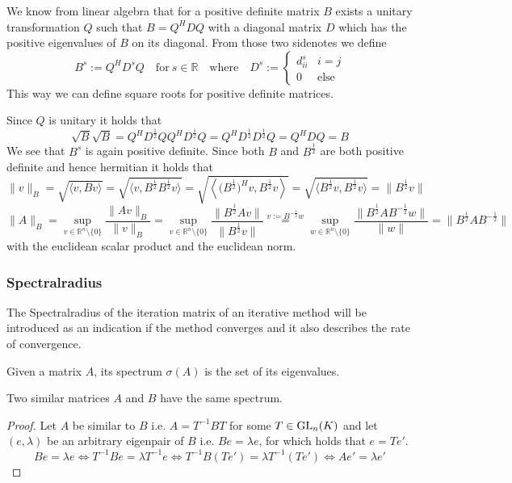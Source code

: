We know from linear algebra that for a positive definite matrix \(B\) exists a unitary transformation \(Q\) such that \(B = Q^HDQ\) with a diagonal matrix \(D\) which has the positive eigenvalues of \(B\) on its diagonal.
From those two sidenotes we define
\[B^s := Q^HD^sQ \quad\text{for}~s \in \mathbb{R} \quad\text{where}\quad D^s := \begin{cases} d_{ii}^s & i = j\\ 0 & \text{else}\end{cases}\]
This way we can define square roots for positive definite matrices.

Since \(Q\) is unitary it holds that
\[\sqrt{B}\sqrt{B} = Q^HD^\frac{1}{2}QQ^HD^\frac{1}{2}Q = Q^HD^\frac{1}{2}D^\frac{1}{2}Q = Q^HDQ = B\]
We see that \(B^s\) is again positive definite.
Since both \(B\) and \(B^\frac{1}{2}\) are both positive definite and hence hermitian it holds that
\[\|v\|_B = \sqrt{\langle v, Bv \rangle} = \sqrt{\langle v, B^\frac{1}{2}B^\frac{1}{2}v \rangle} = \sqrt{\left\langle \big(B^\frac{1}{2}\big)^Hv, B^\frac{1}{2}v \right\rangle} = \sqrt{\langle B^\frac{1}{2}v, B^\frac{1}{2}v\rangle} = \|B^\frac{1}{2}v\|\]
\[\|A\|_B = \sup_{v \in \mathbb{R}^n\setminus\{0\}} \frac{\|Av\|_B}{\|v\|_B} = \sup_{v \in \mathbb{R}^n\setminus\{0\}} \frac{\|B^\frac{1}{2}Av\|}{\|B^\frac{1}{2}v\|} \overset{v := B^{-\frac{1}{2}}w}{=} \sup_{w \in \mathbb{R}^n\setminus\{0\}} \frac{\|B^\frac{1}{2}AB^{-\frac{1}{2}}w\|}{\|w\|} = \|B^\frac{1}{2}AB^{-\frac{1}{2}}\|\]
with the euclidean scalar product and the euclidean norm.

\subsubsection{Spectralradius}
The Spectralradius of the iteration matrix of an iterative method will be introduced as an indication if the method converges and it also describes the rate of convergence.
\begin{definition}[Spectrum]
   Given a matrix \(A\), its spectrum \(\sigma(A)\) is the set of its eigenvalues.
\end{definition}

\begin{lemma}\label{lem:sim_eq_spect}
   Two similar matrices \(A\) and \(B\) have the same spectrum.
\end{lemma}
\begin{proof}
   Let \(A\) be similar to \(B\) i.e. \(A = T^{-1}BT\) for some \(T \in \operatorname{GL}_n(K)\) and let \((e, \lambda)\) be an arbitrary eigenpair of \(B\) i.e. \(Be = \lambda e\), for which holds that \(e = Te'\).
   \[Be = \lambda e \iff T^{-1}Be = \lambda T^{-1}e \iff T^{-1}B(Te') = \lambda T^{-1}(Te') \iff Ae' = \lambda e'\]
\end{proof}

